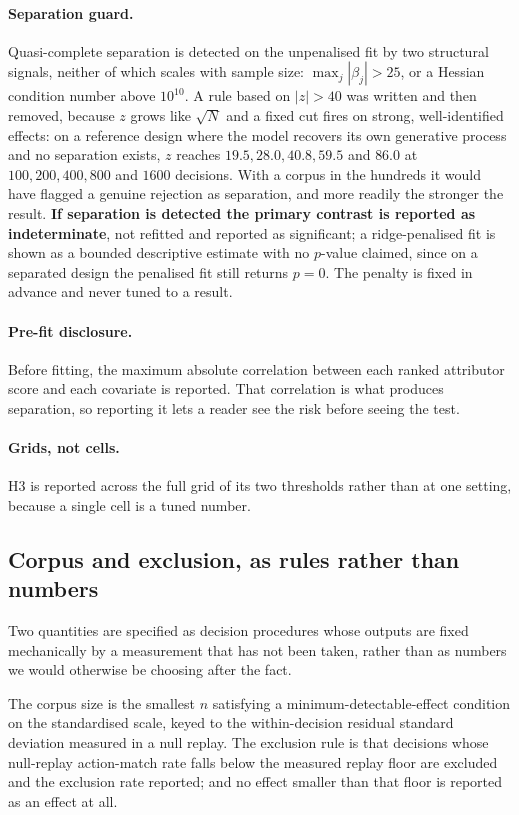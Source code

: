 \documentclass[11pt]{article}
\theoremstyle{remark}
\begin{document}
\paragraph{Separation guard.} Quasi-complete separation is detected on the
unpenalised fit by two structural signals, neither of which scales with sample
size: $\max_j |\beta_j| > 25$, or a Hessian condition number above $10^{10}$. A
rule based on $|z| > 40$ was written and then removed, because $z$ grows like
$\sqrt{N}$ and a fixed cut fires on strong, well-identified effects: on a
reference design where the model recovers its own generative process and no
separation exists, $z$ reaches $19.5, 28.0, 40.8, 59.5$ and $86.0$ at $100, 200,
400, 800$ and $1600$ decisions. With a corpus in the hundreds it would have
flagged a genuine rejection as separation, and more readily the stronger the
result. \textbf{If separation is detected the primary contrast is reported as
indeterminate}, not refitted and reported as significant; a ridge-penalised fit
is shown as a bounded descriptive estimate with no $p$-value claimed, since on a
separated design the penalised fit still returns $p = 0$. The penalty is fixed in
advance and never tuned to a result.

\paragraph{Pre-fit disclosure.} Before fitting, the maximum absolute correlation
between each ranked attributor score and each covariate is reported. That
correlation is what produces separation, so reporting it lets a reader see the
risk before seeing the test.

\paragraph{Grids, not cells.} H3 is reported across the full grid of its two
thresholds rather than at one setting, because a single cell is a tuned number.

\subsection{Corpus and exclusion, as rules rather than numbers}

Two quantities are specified as decision procedures whose outputs are fixed
mechanically by a measurement that has not been taken, rather than as numbers we
would otherwise be choosing after the fact.

The corpus size is the smallest $n$ satisfying a minimum-detectable-effect
condition on the standardised scale, keyed to the within-decision residual
standard deviation measured in a null replay. The exclusion rule is that
decisions whose null-replay action-match rate falls below the measured replay
floor are excluded and the exclusion rate reported; and no effect smaller than
that floor is reported as an effect at all.
\end{document}
